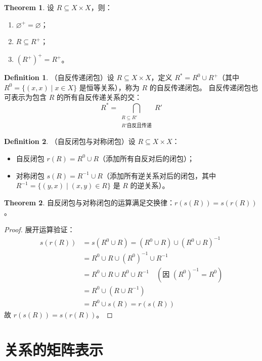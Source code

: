 \documentclass[oneside]{book}
\theoremstyle{definition}
\newtheorem{definition}{Definition}[section]
\newtheorem{theorem}{Theorem}[section]
\begin{document}
\begin{theorem}
	设 \( R \subseteq X \times X \)，则：
	\begin{enumerate}
		\item \( \varnothing^+ = \varnothing \)；
		\item \( R \subseteq R^+ \)；
		\item \( (R^+)^+ = R^+ \)。
	\end{enumerate}
\end{theorem}


\begin{definition}
	（自反传递闭包）设 \( R \subseteq X \times X \)，定义 \( R^* = R^0 \cup R^+ \)（其中 \( R^0 = \{ (x,x) \mid x \in X \} \) 是恒等关系），称为 \( R \) 的自反传递闭包。
	自反传递闭包也可表示为包含 \( R \) 的所有自反传递关系的交：
	\[
	R^* = \bigcap_{\substack{R \subseteq R' \\ R' \text{自反且传递}}} R'
	\]
\end{definition}


\begin{definition}
	（自反闭包与对称闭包）设 \( R \subseteq X \times X \)：
	\begin{itemize}
		\item 自反闭包 \( r(R) = R^0 \cup R \)（添加所有自反对后的闭包）；
		\item 对称闭包 \( s(R) = R^{-1} \cup R \)（添加所有逆关系对后的闭包，其中 \( R^{-1} = \{ (y,x) \mid (x,y) \in R \} \) 是 \( R \) 的逆关系）。
	\end{itemize}
\end{definition}


\begin{theorem}
	自反闭包与对称闭包的运算满足交换律：\( r(s(R)) = s(r(R)) \)。
\end{theorem}

\begin{proof}
	展开运算验证：
	\[
	\begin{aligned}
		s(r(R)) &= s(R^0 \cup R) = (R^0 \cup R) \cup (R^0 \cup R)^{-1} \\
		&= R^0 \cup R \cup (R^0)^{-1} \cup R^{-1} \\
		&= R^0 \cup R \cup R^0 \cup R^{-1} \quad (\text{因 } (R^0)^{-1} = R^0) \\
		&= R^0 \cup (R \cup R^{-1}) \\
		&= R^0 \cup s(R) = r(s(R))
	\end{aligned}
	\]
	故 \( r(s(R)) = s(r(R)) \)。
\end{proof}


\section{关系的矩阵表示}
\end{document}
